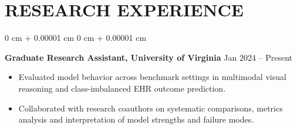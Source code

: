 \documentclass[10pt, letterpaper]{article}
\newenvironment{highlights}{
    \begin{itemize}[
        topsep=0.10 cm,
        parsep=0.10 cm,
        partopsep=0pt,
        itemsep=0pt,
        leftmargin=0 cm + 10pt
    ]
}{
    \end{itemize}
} %
\newenvironment{onecolentry}{
    \begin{adjustwidth}{
        0 cm + 0.00001 cm
    }{
        0 cm + 0.00001 cm
    }
}{
    \end{adjustwidth}
} %
\begin{document}
\section{RESEARCH EXPERIENCE}
\begin{onecolentry}
\textbf{Graduate Research Assistant, University of Virginia} \hfill Jan 2024 -- Present
\begin{highlights}
\item Evaluated model behavior across benchmark settings in multimodal visual reasoning and class-imbalanced EHR outcome prediction.
\item Collaborated with research coauthors on systematic comparisons, metrics analysis and interpretation of model strengths and failure modes.
\end{highlights}
\end{onecolentry}
\end{document}
